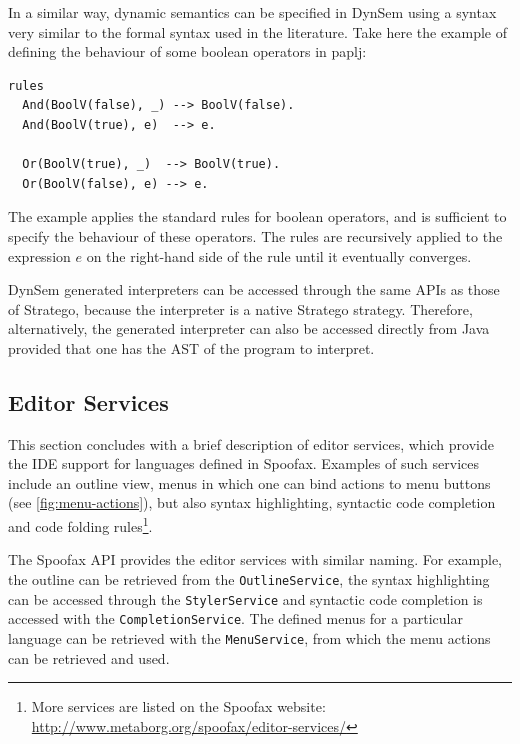 In a similar way, dynamic semantics can be specified in DynSem using a
syntax very similar to the formal syntax used in the literature. Take
here the example of defining the behaviour of some boolean operators
in paplj:
\lstset{language=dynsem,numbers=left}
\begin{lstlisting}
rules
  And(BoolV(false), _) --> BoolV(false).
  And(BoolV(true), e)  --> e.

  Or(BoolV(true), _)  --> BoolV(true).
  Or(BoolV(false), e) --> e.
\end{lstlisting}
The example applies the standard rules for boolean operators, and is
sufficient to specify the behaviour of these operators. The rules are
recursively applied to the expression \(e\) on the right-hand side of
the rule until it eventually converges.

DynSem generated interpreters can be accessed through the same APIs as
those of Stratego, because the interpreter is a native Stratego
strategy. Therefore, alternatively, the generated interpreter can also
be accessed directly from Java provided that one has the AST of the
program to interpret.

\lstset{numbers=none}

\subsection{Editor Services}
\label{ssec:editor-serv}
This section concludes with a brief description of editor services,
which provide the IDE support for languages defined in
Spoofax. Examples of such services include an outline view, menus in
which one can bind actions to menu buttons (see
\cref{fig:menu-actions}), but also syntax highlighting, syntactic code
completion and code folding rules\footnote{More services are
listed on the Spoofax website:
\url{http://www.metaborg.org/spoofax/editor-services/}}.

The Spoofax API provides the editor services with similar naming. For
example, the outline can be retrieved from the \texttt{OutlineService}, the
syntax highlighting can be accessed through the \texttt{StylerService} and
syntactic code completion is accessed with the
\texttt{CompletionService}. The defined menus for a particular language can
be retrieved with the \texttt{MenuService}, from which the menu actions can
be retrieved and used.

